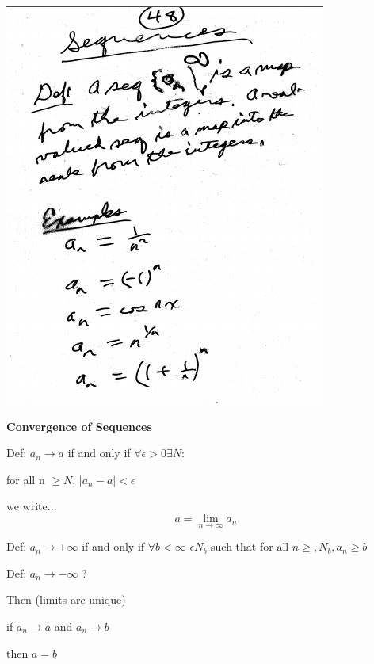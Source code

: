 \documentclass[10pt,a4paper]{article}
\begin{document}
\includegraphics[scale=.8]{Pages/S&L_page48}

\newpage

{\bf Convergence of Sequences} 

Def: $a_{n} \rightarrow a$ if and only if $\forall \epsilon > 0\exists N$:

for all n $\geq N$, $|a_{n} - a| < \epsilon$

we write... $$a = \lim_{n \rightarrow \infty} a_{n}$$

Def: $a_{n} \rightarrow + \infty$ if and only if $\forall b < \infty$ $\epsilon N_{b}$ such that for all $n \geq , N_{b} , a_{n} \geq b$ 

Def: $a_{n} \rightarrow - \infty$ ?

Then (limits are unique)

if $a_{n} \rightarrow a$ and $a_{n} \rightarrow b$

then $a=b$
\end{document}
